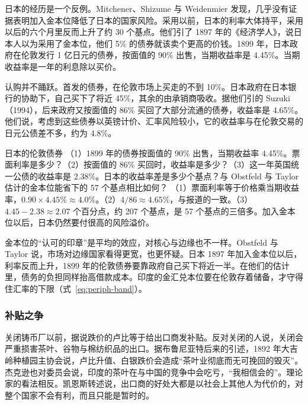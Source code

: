 日本的经历是一个反例。Mitchener、Shizume 与 Weidenmier 发现，几乎没有证据表明加入金本位降低了日本的国家风险\cite{mitchener2009}。采用以前，日本的利率大体持平，采用以后的六个月里反而上升了约 30 个基点\cite{mitchener2009}。他们引了 1897 年的《经济学人》，说日本人以为采用了金本位，他们 5\% 的债券就该卖个更高的价钱\cite{mitchener2009}。1899 年，日本政府在伦敦发行 1 亿日元的债券，按面值的 90\% 出售，当期收益率是 4.45\%\cite{mitchener2009}。当期收益率是一年的利息除以买价。

认购并不踊跃。首发的债券，在伦敦市场上买走的不到 10\%\cite{mitchener2009}。日本政府在日本银行的协助下，自己买下了将近 45\%，其余的由承销商吸收\cite{mitchener2009}。据他们引的 Suzuki（1994），后来政府又按面值的 86\% 买回了大部分流通的债券，收益率是 4.65\%\cite{mitchener2009}。他们说，考虑到这些债券以英镑计价、汇率风险较小，它的收益率与在伦敦交易的日元公债差不多，约为 4.8\%\cite{mitchener2009}。

\begin{example}{日本的伦敦债券}\label{ex:periph-yen}
（1）1899 年的债券按面值的 90\% 出售，当期收益率 4.45\%。票面利率是多少？（2）按面值的 86\% 买回时，收益率是多少？（3）这一年英国统一公债的收益率是 2.38\%\cite{boe2017}。日本的收益率差是多少个基点？与 Obstfeld 与 Taylor 估计的金本位能省下的 57 个基点相比如何？
\solution （1）票面利率等于价格乘当期收益率，$0.90\times4.45\%\approx4.0\%$。（2）$4/86\approx4.65\%$，与报道的一致。（3）$4.45-2.38\approx2.07$ 个百分点，约 207 个基点，是 57 个基点的三倍多。加入金本位以后，日本仍然要付很高的风险溢价。
\end{example}

\begin{pitfall}[加入金本位就能借到便宜的钱]
金本位的“认可的印章”是平均的效应，对核心与边缘也不一样。Obstfeld 与 Taylor 说，市场对边缘国家看得更宽，也更怀疑\cite{obstfeld2002}。日本 1897 年加入金本位以后，利率反而上升，1899 年的伦敦债券要靠政府自己买下将近一半\cite{mitchener2009}。在他们的估计里，债务的负担同样抬高借款成本\cite{obstfeld2002}。印度的金汇兑本位要在伦敦存着储备，才守得住汇率的下限（式~\eqref{eq:periph-band}）。
\end{pitfall}

\subsubsection{补贴之争}
关闭铸币厂以前，据说跌价的卢比等于给出口商发补贴\cite{keynes1913}。反对关闭的人说，关闭会严重损害茶叶、谷物与棉纺织品的出口\cite{keynes1913}。据布鲁尼亚特后来的引述，1892 年大吉岭种植园主协会说，卢比升值、白银跌价会造成“茶叶业彻底而无可挽回的毁灭”\cite{keynes1913}。杰克逊也对委员会说，印度的茶叶在与中国的竞争中会吃亏，“我相信会的”\cite{herschell1893}。理论家的看法相反。凯恩斯转述说，出口商的好处大都是以社会上其他人为代价的，对整个国家不会有利，而且只能是暂时的\cite{keynes1913}。

